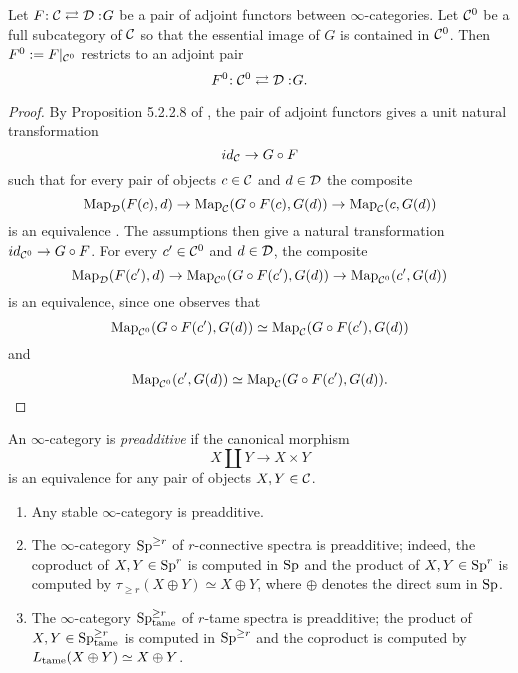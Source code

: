 




\begin{proposition}
\label{Restrict adjoints to full subcategory}
	Let $F\negmedspace: {\mathcal{C}}\rightleftarrows {\mathcal{D}}:\negmedspace G$ be a pair of adjoint functors between $\infty$-categories.
	Let ${\mathcal{C}}^0$ be a full subcategory of ${\mathcal{C}}$ so that the essential image of $G$ is contained in ${\mathcal{C}}^0$. Then $F^0:=F|_{{\mathcal{C}}^0}$ restricts to an adjoint pair 
	$$
	F^0\negmedspace: {\mathcal{C}}^0\rightleftarrows {\mathcal{D}}:\negmedspace G.
	$$
\end{proposition}
\begin{proof}
    By Proposition 5.2.2.8 of \cite{HTT}, the pair of adjoint functors gives a unit natural transformation
    \[
    id_{{\mathcal{C}}} \to G\circ F
    \]
    such that for every pair of objects $c\in {\mathcal{C}}$ and $d\in {\mathcal{D}}$ the composite
    \[
    \operatorname{Map}_{{\mathcal{D}}}(F(c),d) \to \operatorname{Map}_{\mathcal{C}}(G\circ F(c),G(d)) \to \operatorname{Map}_{{\mathcal{C}}}(c,G(d))
    \]
    is an equivalence .
	The assumptions then give a natural transformation $id_{{\mathcal{C}}^{0}}\to G\circ F$.
	For every $c'\in {\mathcal{C}}^0$ and $d\in {\mathcal{D}}$, the composite 
	\[
	\operatorname{Map}_{{\mathcal{D}}}(F(c'),d) \to \operatorname{Map}_{{\mathcal{C}}^0}(G\circ F(c'),G(d)) \to \operatorname{Map}_{{\mathcal{C}}^{0}}(c',G(d))
	\] 
	is an equivalence, since one observes that
	$$
	\operatorname{Map}_{{\mathcal{C}}^0}(G\circ F(c'),G(d))\simeq \operatorname{Map}_{{\mathcal{C}}}(G\circ F(c'),G(d))
	$$
	and 
	$$
	\operatorname{Map}_{{\mathcal{C}}^0}(c',G(d))\simeq \operatorname{Map}_{{\mathcal{C}}}(G\circ F(c'),G(d)).
	$$
	\end{proof}

\begin{definition}
\cite[Definition 2.1]{Gepner-Moritz-Nikolaus}
\label{preadditive}
    An $\infty$-category is \emph{preadditive} if the canonical morphism 
    $$
    X\coprod Y \to X\times Y
    $$
    is an equivalence for any pair of objects $X,Y \in {\mathcal{C}}$.
\end{definition}

\begin{example}
\begin{enumerate}
    \item Any stable $\infty$-category is preadditive.
    \item The $\infty$-category $\operatorname{Sp}^{\geq r}$ of $r$-connective spectra is preadditive;
    indeed, the coproduct of $X,Y\in \operatorname{Sp}^{r}$ is computed in $\operatorname{Sp}$ and the product of $X,Y\in \operatorname{Sp}^{r}$ is computed by $\tau_{\geq r} (X\oplus Y)\simeq X\oplus Y$, where $\oplus$ denotes the direct sum in $\operatorname{Sp}$.
    \item The $\infty$-category $\operatorname{Sp}^{\geq r}_{\operatorname{\operatorname{tame}}}$ of $r$-tame spectra is preadditive; the product of $X,Y\in \operatorname{Sp}^{\geq r}_{\operatorname{\operatorname{tame}}}$ is computed in $\operatorname{Sp}^{\geq r}$ and the coproduct is computed by $L_{\operatorname{\operatorname{tame}}}(X\oplus Y) \simeq X\oplus Y$.
\end{enumerate}

\end{example}


